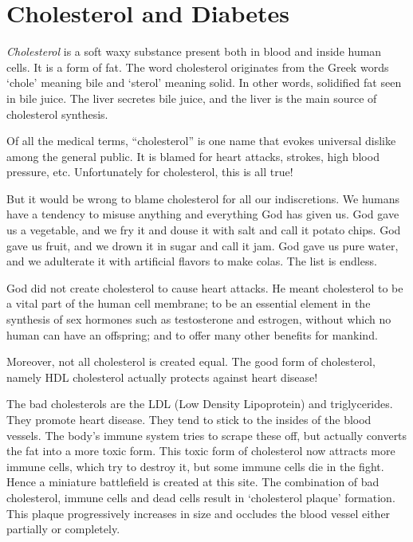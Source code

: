 \chapter{Cholesterol and Diabetes}

\textit{Cholesterol} is a soft waxy substance present both in blood and inside human cells. It is a form of fat. The word cholesterol originates from the Greek words ‘chole’ meaning bile and ‘sterol’ meaning solid. In other words, solidified fat seen in bile juice. The liver secretes bile juice, and the liver is the main source of cholesterol synthesis.

Of all the medical terms, “cholesterol” is one name that evokes universal dislike among the general public. It is blamed for heart attacks, strokes, high blood pressure, etc. Unfortunately for cholesterol, this is all true!

But it would be wrong to blame cholesterol for all our indiscretions. We humans have a tendency to misuse anything and everything God has given us. God gave us a vegetable, and we fry it and douse it with salt and call it potato chips. God gave us fruit, and we drown it in sugar and call it jam. God gave us pure water, and we adulterate it with artificial flavors to make colas. The list is endless.

God did not create cholesterol to cause heart attacks. He meant cholesterol to be a vital part of the human cell membrane; to be an essential element in the synthesis of sex hormones such as testosterone and estrogen, without which no human can have an offspring; and to offer many other benefits for mankind.

Moreover, not all cholesterol is created equal. The good form of cholesterol, namely HDL cholesterol actually protects against heart disease!

The bad cholesterols are the LDL (Low Density Lipoprotein) and triglycerides. They promote heart disease. They tend to stick to the insides of the blood vessels. The body’s immune system tries to scrape these off, but actually converts the fat into a more toxic form. This toxic form of cholesterol now attracts more immune cells, which try to destroy it, but some immune cells die in the fight. Hence a miniature battlefield is created at this site. The combination of bad cholesterol, immune cells and dead cells result in ‘cholesterol plaque’ formation. This plaque progressively increases in size and occludes the blood vessel either partially or completely.

